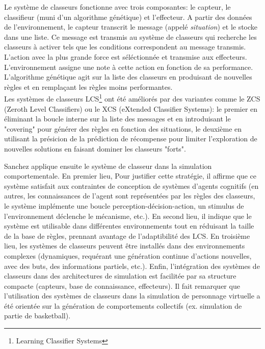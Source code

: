 \documentclass[11pt]{article}
\begin{document}
Le système de classeurs fonctionne avec trois composantes: le capteur, le classifieur (muni d'un algorithme génétique) et l'effecteur. A partir des données de l'environnement, le capteur transcrit le message (appelé \textit{situation}) et le stocke dans une liste. Ce message est transmis au système de classeurs qui recherche les classeurs à activer tels que les conditions correspondent au message transmis. L'action avec la plus grande force est séléctionnée et transmise aux effecteurs. L'environnement assigne une note à cette action en fonction de sa performance. L'algorithme génétique agit sur la liste des classeurs en produisant de nouvelles règles et en remplaçant les règles moins performantes.\\
Les systèmes de classeurs LCS\footnote{Learning Classifier Systems} ont été améliorés par des variantes comme le ZCS (Zeroth Level Classifiers) ou le XCS (eXtended Classifier Systems): le premier en éliminant la boucle interne sur la liste des messages et en introduisant le "covering" pour générer des règles en fonction des situations, le deuxième en utilisant la présicion de la prédiction de récompense pour limiter l'exploration de nouvelles solutions en faisant dominer les classeurs "forts". 

Sanchez applique ensuite le système de classeur dans la simulation comportementale. En premier lieu, Pour justifier cette stratégie, il affirme que ce système satisfait aux contraintes de conception de systèmes d'agents cognitifs (en autres, les connaissances de l'agent sont représentées par les règles des classeurs, le système implémente une boucle perception-décision-action, un stimulus de l'environnement déclenche le mécanisme, etc.). En second lieu, il indique que le système est utilisable dans différentes environnements tout en réduisant la taille de la base de règles, prennant avantage de l'adaptibilité des LCS. En troisième lieu, les systèmes de classeurs peuvent être installés dans des environnements complexes (dynamiques, requérant une génération continue d'actions nouvelles, avec des buts, des informations partiels, etc.). Enfin, l'intégration des systèmes de classeurs dans des architectures de simulation est facilitée par sa structure compacte (capteurs, base de connaissance, effecteurs). Il fait remarquer que l'utilisation des systèmes de classeurs dans la simulation de personnage virtuelle a été orientée sur la génération de comportements collectifs (ex. simulation de partie de basketball).
\end{document}
